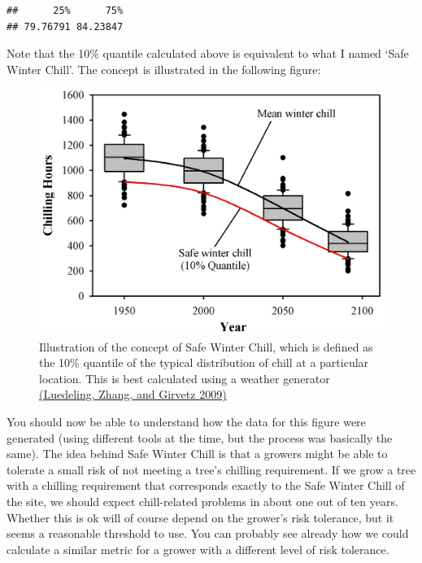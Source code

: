 \documentclass[
]{book}
\newenvironment{Shaded}{\begin{snugshade}}{\end{snugshade}}
\newcommand{\CommentTok}[1]{\textcolor[rgb]{0.56,0.35,0.01}{\textit{#1}}}
\newcommand{\FloatTok}[1]{\textcolor[rgb]{0.00,0.00,0.81}{#1}}
\newcommand{\KeywordTok}[1]{\textcolor[rgb]{0.13,0.29,0.53}{\textbf{#1}}}
\newcommand{\NormalTok}[1]{#1}
\newcommand{\OperatorTok}[1]{\textcolor[rgb]{0.81,0.36,0.00}{\textbf{#1}}}
\begin{document}
\begin{Shaded}
\end{Shaded}

\begin{verbatim}
##      25%      75% 
## 79.76791 84.23847
\end{verbatim}

Note that the 10\% quantile calculated above is equivalent to what I named `Safe Winter Chill'. The concept is illustrated in the following figure:

\begin{figure}
\centering
\includegraphics{pictures/Figure_2_Boxplots_Davis_chilling_hours_a2.JPG}
\caption{Illustration of the concept of Safe Winter Chill, which is defined as the 10\% quantile of the typical distribution of chill at a particular location. This is best calculated using a weather generator \href{https://dx.plos.org/10.1371/journal.pone.0006166}{(Luedeling, Zhang, and Girvetz \protect\hyperlink{ref-luedeling_climatic_2009}{2009})}}
\end{figure}

You should now be able to understand how the data for this figure were generated (using different tools at the time, but the process was basically the same). The idea behind Safe Winter Chill is that a growers might be able to tolerate a small risk of not meeting a tree's chilling requirement. If we grow a tree with a chilling requirement that corresponds exactly to the Safe Winter Chill of the site, we should expect chill-related problems in about one out of ten years. Whether this is ok will of course depend on the grower's risk tolerance, but it seems a reasonable threshold to use. You can probably see already how we could calculate a similar metric for a grower with a different level of risk tolerance.
\end{document}
